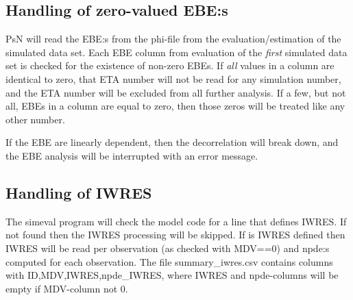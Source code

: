 \subsection{Handling of zero-valued EBE:s}
PsN will read the EBE:s from the phi-file from the evaluation/estimation of the simulated data set.
Each EBE column from evaluation of the \emph{first} simulated data set is checked for the existence of
non-zero EBEs. If \emph{all} values in a column are identical to zero, that ETA number will not be read
for any simulation number, and the ETA number will be excluded from all further analysis.
If a few, but not all, EBEs in a column are equal to zero, then those zeros will be treated like
any other number.

If the EBE are linearly dependent, then the decorrelation will break down, and the EBE analysis will
be interrupted with an error message.

\subsection{Handling of IWRES}
The simeval program will check the model code for a line that defines IWRES.
If not found then the IWRES processing will be skipped.
If is IWRES defined then IWRES will be read per observation (as checked with MDV==0)
and npde:s computed for each observation.
The file summary\_iwres.csv contains columns with ID,MDV,IWRES,npde\_IWRES,
where IWRES and npde-columns will be empty if MDV-column not 0.



